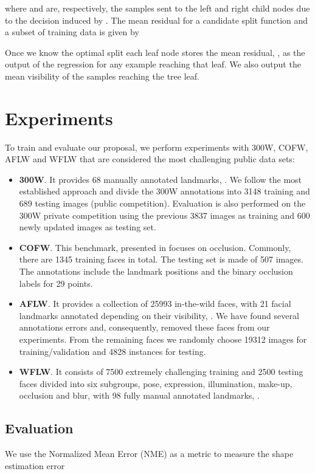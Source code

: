 \documentclass[11pt,twocolumn]{article}
\begin{document}
where  and  are, respectively, the samples sent to the left and right child nodes due to the decision induced by . The mean residual  for a candidate split function and a subset of training data is given by


Once we know the optimal split each leaf node stores the mean residual, , as the output of the regression for any example reaching that leaf. We also output the mean visibility of the samples reaching the tree leaf.



\section{Experiments}\label{sec:experiments}
To train and evaluate our proposal, we perform experiments with 300W, COFW, AFLW and WFLW that are considered the most challenging public data sets:
\begin{itemize}
\item \textbf{300W}. It provides 68 manually annotated landmarks, \cite{Sagonas16}. We follow the most established approach and divide the 300W annotations into 3148 training and 689 testing images (public competition). Evaluation is also performed on the 300W private competition using the previous 3837 images as training and 600 newly updated images as testing set.
\item \textbf{COFW}. This benchmark, presented in \cite{Burgos13} focuses on occlusion. Commonly, there are 1345 training faces in total. The testing set is made of 507 images. The annotations include the landmark positions and the binary occlusion labels for 29 points.
\item \textbf{AFLW}. It provides a collection of 25993 in-the-wild faces, with 21 facial landmarks annotated depending on their visibility, \cite{Koestinger11}. We have found several annotations errors and, consequently, removed these faces from our experiments. From the remaining faces we randomly choose 19312 images for training/validation and 4828 instances for testing. \item \textbf{WFLW}. It consists of 7500 extremely challenging training and 2500 testing faces divided into six subgroups, pose, expression, illumination, make-up, occlusion and blur,
with 98 fully manual annotated landmarks, \cite{Wu18}.
\end{itemize}

\subsection{Evaluation}
We use the Normalized Mean Error (NME) as a metric to measure the shape estimation error
\end{document}
